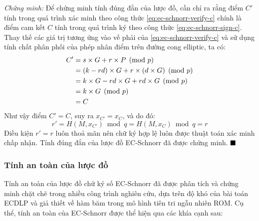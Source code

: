 \textit{Chứng minh:} Để chứng minh tính đúng đắn của lược đồ, cần chỉ ra rằng điểm $C'$ tính trong quá trình xác minh theo công thức \eqref{eq:ec-schnorr-verify-c} chính là điểm cam kết $C$ tính trong quá trình ký theo công thức \eqref{eq:ec-schnorr-sign-c}. Thay thế các giá trị tương ứng vào vế phải của \eqref{eq:ec-schnorr-verify-c} và sử dụng tính chất phân phối của phép nhân điểm trên đường cong elliptic, ta có:
\begin{align}
    C' &= s \times G + r \times P \pmod{p} \notag \\
       &= (k - r d) \times G + r \times (d \times G) \pmod{p} \notag \\
       &= k \times G - r d \times G + r d \times G \pmod{p} \notag \\
       &= k \times G \pmod{p} \notag \\
       &= C
       \label{eq:ec-schnorr-correctness}
\end{align}
Như vậy điểm $C' = C$, suy ra $x_{C'} = x_C$, và do đó:
\begin{equation}
    r' = H(M, x_{C'}) \bmod q = H(M, x_C) \bmod q = r
    \label{eq:ec-schnorr-r-equal}
\end{equation}
Điều kiện $r' = r$ luôn thoả mãn nên chữ ký hợp lệ luôn được thuật toán xác minh chấp nhận. Tính đúng đắn của lược đồ EC-Schnorr đã được chứng minh. $\hfill \blacksquare$

\subsubsection{Tính an toàn của lược đồ}

Tính an toàn của lược đồ chữ ký số EC-Schnorr đã được phân tích và chứng minh chặt chẽ trong nhiều công trình nghiên cứu, dựa trên độ khó của bài toán ECDLP và giả thiết về hàm băm trong mô hình tiên tri ngẫu nhiên ROM. Cụ thể, tính an toàn của EC-Schnorr được thể hiện qua các khía cạnh sau:

